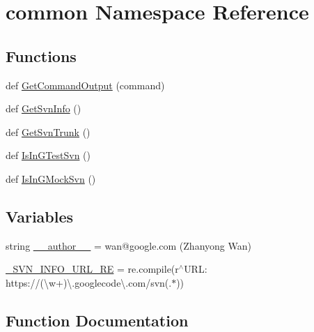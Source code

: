 \hypertarget{namespacecommon}{}\section{common Namespace Reference}
\label{namespacecommon}
\subsection*{Functions}
\begin{DoxyCompactItemize}
\item 
def \mbox{\hyperlink{namespacecommon_ac1337758ae23f6a91b44de07408791da}{Get\+Command\+Output}} (command)
\item 
def \mbox{\hyperlink{namespacecommon_a312d07161b76d965fee6a61e464e283f}{Get\+Svn\+Info}} ()
\item 
def \mbox{\hyperlink{namespacecommon_a9e6483972a8dc0a6a274cbcee69564b0}{Get\+Svn\+Trunk}} ()
\item 
def \mbox{\hyperlink{namespacecommon_af29dcab2d7b4a9dd846446a0987ab387}{Is\+In\+G\+Test\+Svn}} ()
\item 
def \mbox{\hyperlink{namespacecommon_a8219bb529336fc3f0ef8222a5ed48222}{Is\+In\+G\+Mock\+Svn}} ()
\end{DoxyCompactItemize}
\subsection*{Variables}
\begin{DoxyCompactItemize}
\item 
string \mbox{\hyperlink{namespacecommon_ac0f2c8f2583f0817f09a3e0c6022d707}{\+\_\+\+\_\+author\+\_\+\+\_\+}} = \textquotesingle{}wan@google.\+com (Zhanyong Wan)\textquotesingle{}
\item 
\mbox{\hyperlink{namespacecommon_a8441f667816bce34e6100f88a9ea7dfa}{\+\_\+\+S\+V\+N\+\_\+\+I\+N\+F\+O\+\_\+\+U\+R\+L\+\_\+\+RE}} = re.\+compile(r\textquotesingle{}$^\wedge$U\+R\+L\+: https\+://(\textbackslash{}w+)\textbackslash{}.googlecode\textbackslash{}.\+com/svn(.$\ast$)\textquotesingle{})
\end{DoxyCompactItemize}


\subsection{Function Documentation}
\mbox{\label{namespacecommon_ac1337758ae23f6a91b44de07408791da}} 
